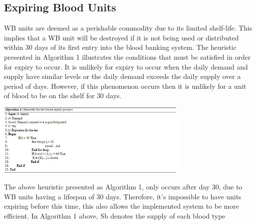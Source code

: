 \documentclass{article}
\begin{document}
\subsection{Expiring Blood Units}
WB units are deemed as a perishable commodity due to its limited shelf-life. This implies that a WB unit will be destroyed if it is not being used or distributed within 30 days of its first entry into the blood banking system. The heuristic presented in Algorithm 1 illustrates the conditions that must be satisfied in order for expiry to occur. It is unlikely for expiry to occur when the daily demand and supply have similar levels or the daily demand exceeds the daily supply over a period of days. However, if this phenomenon occurs then it is unlikely for a unit of blood to be on the shelf for 30 days.\\
\break

\includegraphics[width=0.7\textwidth, center]{Images/Alg1.JPG}
\begin {center}
The above heuristic presented as Algorithm 1, only occurs after day 30, due to WB units having a lifespan of 30 days. Therefore, it’s impossible to have units expiring before this time, this also allows the implemented system to be more efficient. In Algorithm 1 above, Sb denotes the supply of each blood type
\end {center}
\end{document}
